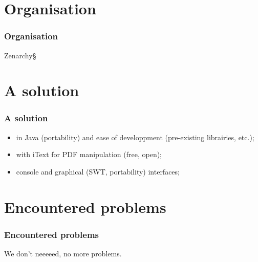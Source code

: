 \documentclass[t,12pt]{beamer}
\begin{document}
\section{Organisation}
\begin{frame}
  \frametitle{Organisation}
  Zenarchy§
\end{frame}

\section{A solution}
\begin{frame}
  \frametitle{A solution}
  \begin{itemize}
    \item in Java (portability) and ease of developpment (pre-existing
      librairies, etc.);
    \pause \item with iText for PDF manipulation (free, open);
    \pause \item console and graphical (SWT, portability) interfaces;
  \end{itemize}
\end{frame}

\section{Encountered problems}
\begin{frame}
  \frametitle{Encountered problems}
  We don't neeeeed, no more problems.
\end{frame}

% 
\end{document}
